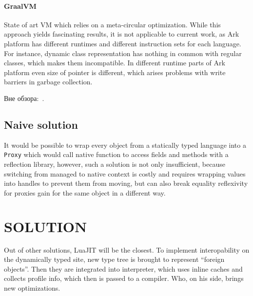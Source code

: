 \documentclass[times, %
               specification,annotation, %
               titlepage-extra-ru,specification-extra-ru,annotation-extra-ru, %
               languages={russian,english} %
              ]{itmo-student-thesis}
\begin{document}
\subsubsection{GraalVM}
State of art VM which relies on a meta-circular optimization. While this approach yields fascinating results, it is not applicable to current work, as Ark platform has different runtimes and different instruction sets for each language. For instance, dynamic class representation has nothing in common with regular classes, which makes them incompatible. In different runtime parts of Ark platform even size of pointer is different, which arises problems with write barriers in garbage collection.

\finishrelatedwork

Вне обзора:~\cite{bellman}.

\section{Naive solution}
It would be possible to wrap every object from a statically typed language into a \texttt{Proxy} which would call native function to access fields and methods with a reflection library, however, such a solution is not only insufficient, because switching from managed to native context is costly and requires wrapping values into handles to prevent them from moving, but can also break equality reflexivity for proxies gain for the same object in a different way.

\chapter{SOLUTION}

Out of other solutions, LuaJIT will be the closest. To implement interopability on the dynamically typed site, new type tree is brought to represent ``foreign objects''. Then they are integrated into interpreter, which uses inline caches and collects profile info, which then is passed to a compiler. Who, on his side, brings new optimizations.
\end{document}
